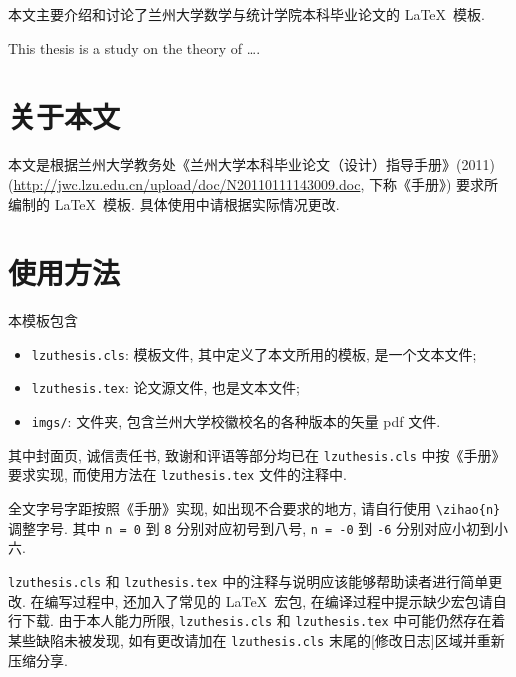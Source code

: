 \documentclass{lzuthesis}
\begin{document}
\makecover

\makeliability

\tableofcontents		%
\newpage

\begin{cnabstract}
	本文主要介绍和讨论了兰州大学数学与统计学院本科毕业论文的 \LaTeX\ 模板.
\end{cnabstract}
\newpage

\begin{enabstract}
	This thesis is a study on the theory of \dots.
\end{enabstract}
\enkeywords{\LaTeX{};}
\newpage


\section{关于本文}

本文是根据兰州大学教务处《兰州大学本科毕业论文（设计）指导手册》(2011)
(\url{http://jwc.lzu.edu.cn/upload/doc/N20110111143009.doc},
下称《手册》) 要求所编制的 \LaTeX\ 模板. 具体使用中请根据实际情况更改. 

\section{使用方法}

本模板包含
\begin{itemize}
	\item \texttt{lzuthesis.cls}: 模板文件, 其中定义了本文所用的模板,
		是一个文本文件;
	\item \texttt{lzuthesis.tex}: 论文源文件, 也是文本文件;
	\item \texttt{imgs/}: 文件夹, 包含兰州大学校徽校名的各种版本的矢量 pdf
		文件. 
\end{itemize}

其中封面页, 诚信责任书, 致谢和评语等部分均已在 \texttt{lzuthesis.cls}
中按《手册》要求实现, 而使用方法在 \texttt{lzuthesis.tex} 文件的注释中. 

全文字号字距按照《手册》实现, 如出现不合要求的地方, 请自行使用
\verb|\zihao{n}| 调整字号. 其中 \verb|n = 0| 到 \verb|8| 分别对应初号到八号, \verb|n = -0| 到 \verb|-6| 分别对应小初到小六.

\texttt{lzuthesis.cls} 和 \texttt{lzuthesis.tex}
中的注释与说明应该能够帮助读者进行简单更改.  在编写过程中, 还加入了常见的
\LaTeX\ 宏包, 在编译过程中提示缺少宏包请自行下载. 由于本人能力所限,
\texttt{lzuthesis.cls} 和 \texttt{lzuthesis.tex}
中可能仍然存在着某些缺陷未被发现, 如有更改请加在 \texttt{lzuthesis.cls}
末尾的[修改日志]区域并重新压缩分享. 
\end{document}
